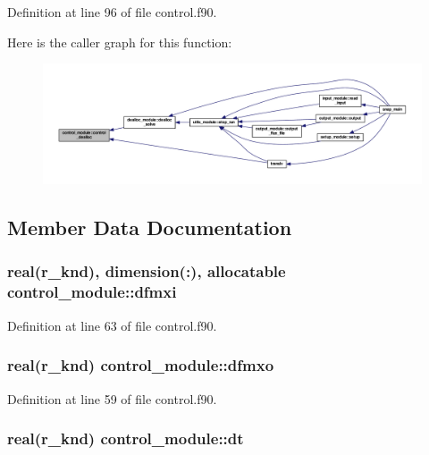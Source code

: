 Definition at line 96 of file control.\-f90.



Here is the caller graph for this function\-:\nopagebreak
\begin{figure}[H]
\begin{center}
\leavevmode
\includegraphics[width=350pt]{classcontrol__module_a2f968e7fae2c9dab97d81d4e8db154c8_icgraph}
\end{center}
\end{figure}




\subsection{Member Data Documentation}
\hypertarget{classcontrol__module_a39abfd20b09ff5ed5e22b69c92038156}{
\subsubsection[{dfmxi}]{\setlength{\rightskip}{0pt plus 5cm}real(r\-\_\-knd), dimension(\-:), allocatable control\-\_\-module\-::dfmxi}}\label{classcontrol__module_a39abfd20b09ff5ed5e22b69c92038156}


Definition at line 63 of file control.\-f90.

\hypertarget{classcontrol__module_a53a34dce98c72051d0043743774ea209}{
\subsubsection[{dfmxo}]{\setlength{\rightskip}{0pt plus 5cm}real(r\-\_\-knd) control\-\_\-module\-::dfmxo}}\label{classcontrol__module_a53a34dce98c72051d0043743774ea209}


Definition at line 59 of file control.\-f90.

\hypertarget{classcontrol__module_af466573cb3712b4a00c930a1720eeb68}{
\subsubsection[{dt}]{\setlength{\rightskip}{0pt plus 5cm}real(r\-\_\-knd) control\-\_\-module\-::dt}}\label{classcontrol__module_af466573cb3712b4a00c930a1720eeb68}



